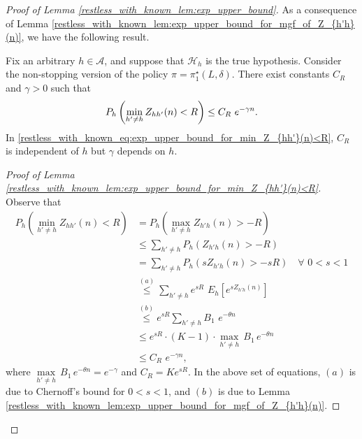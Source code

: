 \begin{proof}[Proof of Lemma \ref{restless_with_known_lem:exp_upper_bound}]
As a consequence of Lemma \ref{restless_with_known_lem:exp_upper_bound_for_mgf_of_Z_{h'h}(n)}, we have the following result.
\begin{lemma}\label{restless_with_known_lem:exp_upper_bound_for_min_Z_{hh'}(n)<R}
	Fix an arbitrary $h\in\mathcal{A}$, and suppose that $\mathcal{H}_h$ is the true hypothesis. Consider the non-stopping version of the policy $\pi=\pi_1^\star(L,\delta)$. There exist constants $C_R$ and $\gamma>0$ such that
	\begin{equation}
		P_h\left(\min\limits_{h'\neq h}Z_{hh'}(n)<R\right)\leq C_R\,\,e^{-\gamma n}.\label{restless_with_known_eq:exp_upper_bound_for_min_Z_{hh'}(n)<R}
	\end{equation}
	In \eqref{restless_with_known_eq:exp_upper_bound_for_min_Z_{hh'}(n)<R}, $C_R$ is independent of $h$ but $\gamma$ depends on $h$.
\end{lemma}
\begin{proof}[Proof of Lemma \ref{restless_with_known_lem:exp_upper_bound_for_min_Z_{hh'}(n)<R}]
Observe that 
\begingroup\allowdisplaybreaks\begin{align}
	P_h\left(\min\limits_{h'\neq h}Z_{hh'}(n)<R\right)&=P_h\left(\max\limits_{h'\neq h}Z_{h'h}(n)>-R\right)\nonumber\\
	&\leq \sum\limits_{h'\neq h}P_h\left(Z_{h'h}(n)>-R\right)\nonumber\\
	&=\sum\limits_{h'\neq h}P_h\left(sZ_{h'h}(n)>-sR\right)\quad \forall\,\, 0<s<1\nonumber\\
	&\stackrel{(a)}{\leq} \sum\limits_{h'\neq h}e^{sR}\,\,E_h\left[e^{s Z_{h'h}(n)}\right]\nonumber\\
	&\stackrel{(b)}{\leq} e^{sR}\sum\limits_{h'\neq h}B_1\,\,e^{-\theta n}\nonumber\\
	&\leq e^{sR}\cdot (K-1)\cdot\max\limits_{h'\neq h} \,B_1\,e^{-\theta n}\nonumber\\
	&\leq C_R\,\,e^{-\gamma n},
\end{align}\endgroup
where $\max\limits_{h'\neq h} \,B_1\,e^{-\theta n}=e^{-\gamma}$ and $C_R=Ke^{sR}$. In the above set of equations, $(a)$ is due to Chernoff's bound for $0<s<1$, and $(b)$ is due to Lemma \ref{restless_with_known_lem:exp_upper_bound_for_mgf_of_Z_{h'h}(n)}.
\end{proof}


\end{proof}
